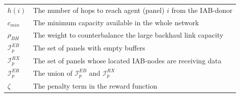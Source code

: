 \begin{table}[!h]
\begin{tabular}{@{\hspace{1pt}} l @{\hspace{1pt}} l}
        $h(i)$ & The number of hops to reach agent (panel) $i$ from the IAB-donor\\
        $c_{min}$ & The minimum capacity available in the whole network\\
        $\rho_{BH}$ & The weight to counterbalance the large backhaul link capacity\\
        $\mathcal{I}_p^{EB}$ & The set of
panels with empty buffers\\
        $\mathcal{I}_p^{RX}$ & The set of panels whose located IAB-nodes are receiving data\\
        $\mathcal{I}_p^{ER}$ & The union of $\mathcal{I}_p^{EB}$ and $\mathcal{I}_p^{RX}$\\
        $\zeta$ & The penalty term in the reward function \\
        \bottomrule
    \end{tabular}
\end{table}